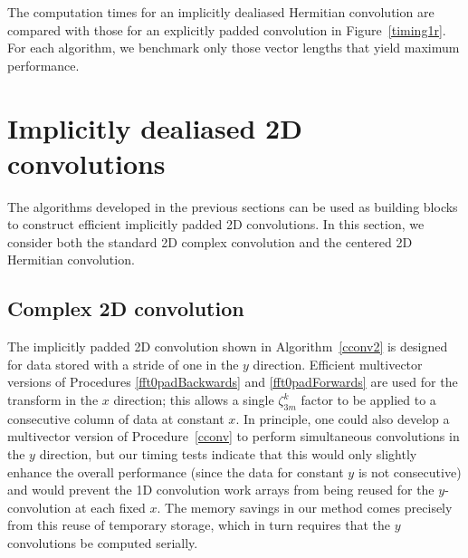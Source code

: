 \documentclass[final]{siamltex}
\def\be{\begin{dmath*}}
\def\ee{\end{dmath*}}
\def\bel{\begin{dmath}}
\def\eel{\end{dmath}}
\def\no{\hiderel}
\begin{document}

The computation times for an implicitly dealiased Hermitian
convolution are compared with those for an explicitly padded convolution in
Figure~\ref{timing1r}. For each algorithm, we benchmark only those vector
lengths that yield maximum performance.

\section{Implicitly dealiased 2D convolutions}\label{2d}
The algorithms developed in the previous sections can be used as building
blocks to construct efficient implicitly padded 2D convolutions.
In this section, we consider both the standard 2D complex convolution and the
centered 2D Hermitian convolution.
\subsection{Complex 2D convolution}
The implicitly padded 2D convolution shown in Algorithm~\ref{cconv2} 
is designed for data stored with a stride of one in the $y$
direction. Efficient multivector versions of Procedures \ref{fft0padBackwards}
and \ref{fft0padForwards} are used for the transform in the $x$ direction;
this allows a single $\zeta_{3m}^k$ factor to be applied to a consecutive
column of data at constant $x$. In principle, one could also develop a
multivector version of Procedure~\ref{cconv} to perform simultaneous
convolutions in the $y$ direction, but our timing tests indicate that this
would only slightly enhance the overall performance (since the data for constant
$y$ is not consecutive) and would prevent the 1D convolution
work arrays from being reused for the $y$-convolution at each fixed $x$. The
memory savings in our method comes precisely from this reuse of temporary
storage, which in turn requires that the $y$ convolutions be computed
serially.
\end{document}
